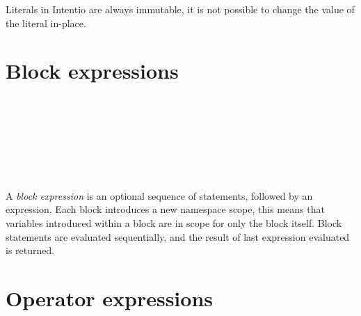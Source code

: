 Literals in Intentio are always immutable, it is not possible to change the value of the literal in-place.

\section{Block expressions}

\begin{bnf}
   \eq {} \\
  \\
   \eq \term{\{} \  \ \term{\}} \\
   \eq \term{(} \  \ \term{)} \\
  \\
   \eq {} \  \ \gtry{\term{;}}
\end{bnf}

A \emph{block expression} is an optional sequence of statements, followed by an expression. Each block introduces a new namespace scope, this means that variables introduced within a block are in scope for only the block itself. Block statements are evaluated sequentially, and the result of last expression evaluated is returned.



\section{Operator expressions}

